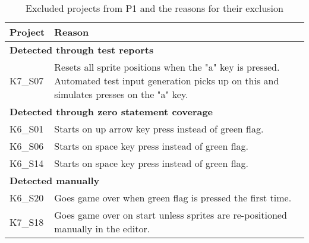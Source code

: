 \begin{table}[htpb]
    \centering
    \scriptsize
    \begin{tabular}{lp{10.5cm}}
        \toprule
        Project & Reason                                                                           \\
        \midrule
        \multicolumn{2}{l}{\textbf{Detected through test reports}}                                 \\
        K7\_S07 & Resets all sprite positions when the "a" key is pressed.
                  Automated test input generation picks up on this and
                  simulates presses on the "a" key.                                                \\[1.4\bigskipamount]

        \multicolumn{2}{l}{\textbf{Detected through zero statement coverage}}                      \\
        K6\_S01 & Starts on up arrow key press instead of green flag.                              \\
        K6\_S06 & Starts on space key press instead of green flag.                                 \\
        K6\_S14 & Starts on space key press instead of green flag.                                 \\[\medskipamount]

        \multicolumn{2}{l}{\textbf{Detected manually}}                                             \\
        K6\_S20 & Goes game over when green flag is pressed the first time.                        \\
        K7\_S18 & Goes game over on start unless sprites are re-positioned manually in the editor. \\
        \bottomrule
    \end{tabular}
    \caption{Excluded projects from P1 and the reasons for their exclusion}
    \label{tab:excluded_projects}
\end{table}

